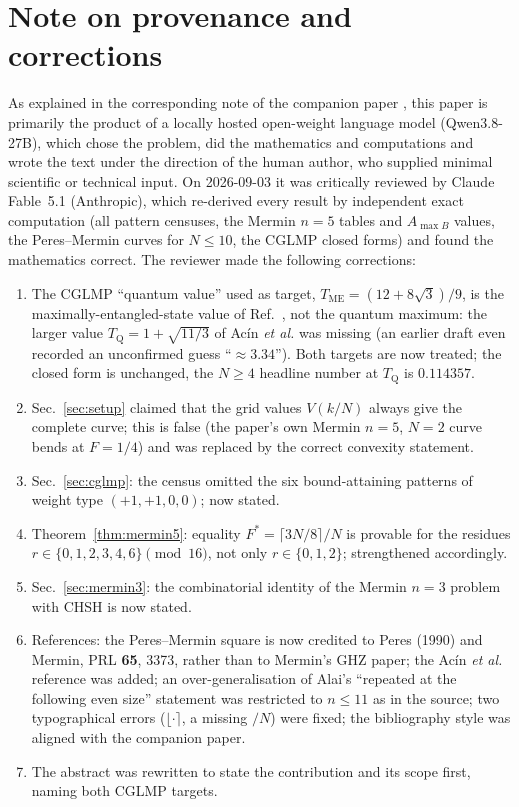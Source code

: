 \documentclass[aps,pra,reprint,superscriptaddress,floatfix]{revtex4-2}
\begin{document}
\section*{Note on provenance and corrections}

As explained in the corresponding note of the companion paper
\cite{mainpaper2026}, this paper is primarily the product of a locally
hosted open-weight language model (Qwen3.8-27B), which chose the problem,
did the mathematics and computations and wrote the text under the direction
of the human author, who supplied minimal scientific or technical input.
On 2026-09-03 it was critically reviewed by Claude Fable~5.1 (Anthropic),
which re-derived every result by independent exact computation (all
pattern censuses, the Mermin $n=5$ tables and $A_{\max B}$ values, the
Peres--Mermin curves for $N\le10$, the CGLMP closed forms) and found the
mathematics correct. The reviewer made the following corrections:
\begin{enumerate}
\item The CGLMP ``quantum value'' used as target,
  $T_{\mathrm{ME}}=(12+8\sqrt3)/9$, is the maximally-entangled-state value
  of Ref.~, not the quantum maximum: the larger value
  $T_{\mathrm{Q}}=1+\sqrt{11/3}$ of Ac\'in \emph{et al.}
  \cite{adgl2002} was missing (an earlier draft even recorded an
  unconfirmed guess ``$\approx3.34$''). Both targets are now treated; the
  closed form is unchanged, the $N\ge4$ headline number at $T_{\mathrm{Q}}$
  is $0.114357$.
\item Sec.~\ref{sec:setup} claimed that the grid values $V(k/N)$ always
  give the complete curve; this is false (the paper's own Mermin $n=5$,
  $N=2$ curve bends at $F=1/4$) and was replaced by the correct convexity
  statement.
\item Sec.~\ref{sec:cglmp}: the census omitted the six bound-attaining
  patterns of weight type $(+1,+1,0,0)$; now stated.
\item Theorem~\ref{thm:mermin5}: equality $F^{*}=\lceil 3N/8\rceil/N$ is
  provable for the residues $r\in\{0,1,2,3,4,6\}\pmod{16}$, not only
  $r\in\{0,1,2\}$; strengthened accordingly.
\item Sec.~\ref{sec:mermin3}: the combinatorial identity of the Mermin
  $n=3$ problem with CHSH is now stated.
\item References: the Peres--Mermin square is now credited to Peres (1990)
  and Mermin, PRL \textbf{65}, 3373, rather than to Mermin's GHZ paper; the
  Ac\'in \emph{et al.} reference was added; an over-generalisation of
  Alai's ``repeated at the following even size'' statement was restricted
  to $n\le11$ as in the source; two typographical errors
  ($\lfloor\cdot\rceil$, a missing $/N$) were fixed; the bibliography style
  was aligned with the companion paper.
\item The abstract was rewritten to state the contribution and its
  scope first, naming both {CGLMP} targets.
\end{enumerate}
\end{document}
